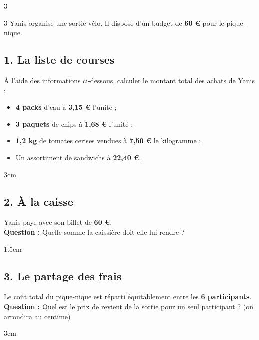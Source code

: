 \documentclass[a4paper]{book}
\begin{document}
{\begin{exerciceNote}{3}
\begin{minipage}{0.45\linewidth}
        \end{minipage}
        \hfill\vline\hfill
        \begin{minipage}{0.45\linewidth}
            \quad {}
            
        \end{minipage}        
    \end{exerciceNote}


    \begin{exerciceNote}{3}
        Yanis organise une sortie vélo. Il dispose d'un budget de \textbf{60 €} pour le pique-nique.

        \subsection*{1. La liste de courses}
        À l'aide des informations ci-dessous, calculer le montant total des achats de Yanis :
        \begin{itemize}
            \item \textbf{4 packs} d'eau à \textbf{3,15 €} l'unité ;
            \item \textbf{3 paquets} de chips à \textbf{1,68 €} l'unité ;
            \item \textbf{1,2 kg} de tomates cerises vendues à \textbf{7,50 €} le kilogramme ;
            \item Un assortiment de sandwichs à \textbf{22,40 €}.
        \end{itemize}
        
        \begin{ZoneReponse}{3cm}
        \end{ZoneReponse}
        
        \subsection*{2. À la caisse}
        Yanis paye avec son billet de \textbf{60 €}. 
        \\ \textbf{Question :} Quelle somme la caissière doit-elle lui rendre ?

        \begin{ZoneReponse}{1.5cm}
        \end{ZoneReponse}
        
        \subsection*{3. Le partage des frais}
        Le coût total du pique-nique est réparti équitablement entre les \textbf{6 participants}.
        \\ \textbf{Question :} Quel est le prix de revient de la sortie pour un seul participant ? (on arrondira au centime)
                \begin{ZoneReponse}{3cm}
        \end{ZoneReponse}
    \end{exerciceNote}

}
\end{document}
